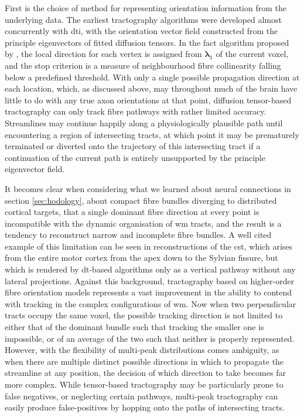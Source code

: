 First is the choice of method for representing orientation information from the underlying data.
The earliest tractography algorithms were developed almost concurrently with \gls{dti}\autocite{Mori1998,Mori1999}, with the orientation vector field constructed from the principle eigenvectors of fitted diffusion tensors.
In the \gls{fact} algorithm proposed by \textcite{Mori1999}, the local direction for each vertex is assigned from $\bm{\lambda}_1$ of the current voxel, and the stop criterion is a measure of neighbourhood fibre collinearity falling below a predefined threshold.
With only a single possible propagation direction at each location, which, as discussed above, may throughout much of the brain have little to do with any true axon orientations at that point, diffusion tensor-based tractography can only track fibre pathways with rather limited accuracy.
Streamlines may continue happily along a physiologically plausible path until encountering a region of intersecting tracts, at which point it may be prematurely terminated or diverted onto the trajectory of this intersecting tract if a continuation of the current path is entirely unsupported by the principle eigenvector field.

It becomes clear when considering what we learned about neural connections in section \ref{sec:hodology}, about compact fibre bundles diverging to distributed cortical targets, that a single dominant fibre direction at every point is incompatible with the dynamic organisation of \gls{wm} tracts, and the result is a tendency to reconstruct narrow and incomplete fibre bundles\autocite{Farquharson2013}.
A well cited example of this limitation can be seen in reconstructions of the \gls{cst}, which arises from the entire motor cortex from the apex down to the Sylvian fissure, but which is rendered by \gls{dt}-based algorithms only as a vertical pathway without any lateral projections.
Against this background, tractography based on higher-order fibre orientation models represents a vast improvement in the ability to contend with tracking in the complex configurations of \gls{wm}.
Now when two perpendicular tracts occupy the same voxel, the possible tracking direction is not limited to either that of the dominant bundle such that tracking the smaller one is impossible, or of an average of the two such that neither is properly represented.
However, with the flexibility of multi-peak distributions comes ambiguity, as when there are multiple distinct possible directions in which to propagate the streamline at any position, the decision of which direction to take becomes far more complex.
While tensor-based tractography may be particularly prone to false negatives, or neglecting certain pathways, multi-peak tractography can easily produce false-positives by hopping onto the paths of intersecting tracts.

